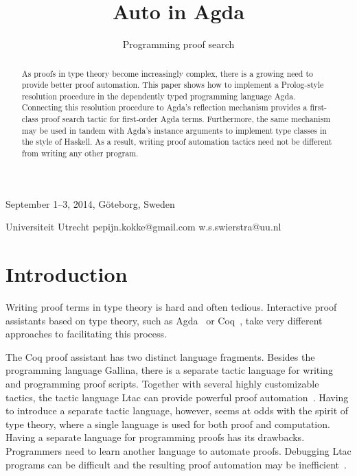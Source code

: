\documentclass[preprint]{sigplanconf}
\begin{document}
 {September 1--3, 2014, G\"oteborg, Sweden}

\title{Auto in Agda}
\subtitle{Programming proof search}

           {Universiteit Utrecht}
           {pepijn.kokke@gmail.com \quad w.s.swierstra@uu.nl}

\maketitle

\begin{abstract}

  As proofs in type theory become increasingly complex, there is a
  growing need to provide better proof automation. This paper shows
  how to implement a Prolog-style resolution procedure in the
  dependently typed programming language Agda. Connecting this
  resolution procedure to Agda's reflection mechanism provides a
  first-class proof search tactic for first-order Agda
  terms. Furthermore, the same mechanism may be used in tandem with
  Agda's instance arguments to implement type classes in the style of
  Haskell. As a result, writing proof automation tactics need not be
  different from writing any other program.
\end{abstract}

\section{Introduction}
\label{sec:intro}

Writing proof terms in type theory is hard and often tedious.
Interactive proof assistants based on type theory, such as
Agda~\cite{agda} or Coq~\cite{coq}, take very different approaches to
facilitating this process.

The Coq proof assistant has two distinct language fragments. Besides
the programming language Gallina, there is a separate tactic language
for writing and programming proof scripts. Together with several
highly customizable tactics, the tactic language Ltac can provide
powerful proof automation~\cite{chlipala}. Having to introduce a
separate tactic language, however, seems at odds with the spirit of
type theory, where a single language is used for both proof and
computation.  Having a separate language for programming proofs has
its drawbacks. Programmers need to learn another language to automate
proofs. Debugging Ltac programs can be difficult and the resulting
proof automation may be inefficient~\cite{brabaint}.
\end{document}
